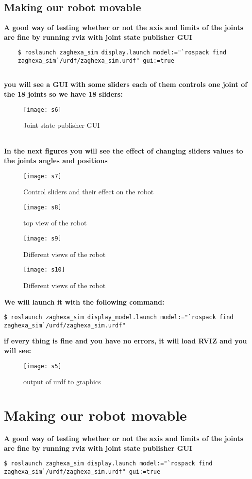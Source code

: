 	\subsection{Making our robot movable}
	\textbf{A good way of testing whether or not the axis and limits of the joints are fine by running rviz with joint state publisher GUI}
	\begin{lstlisting}
	$ roslaunch zaghexa_sim display.launch model:="`rospack find
	zaghexa_sim`/urdf/zaghexa_sim.urdf" gui:=true
	
	\end{lstlisting}
	\textbf{you will see a GUI with some sliders each of them controls one joint of the 18 joints so we have 18 sliders:}
	\begin{figure}[h]
		\centering
		\texttt{[image: s6]}
		\caption{Joint state publisher GUI}
		\label{fig:s6}
	\end{figure}
	\\\textbf{In the next figures you will see the effect of changing sliders values to the joints angles and positions}
	\begin{figure}[H]
		\centering
		\texttt{[image: s7]}
		\caption{Control sliders and their effect on the robot }
		\label{fig:s7}
	\end{figure}
	\begin{figure}[htb]
		\centering
		\texttt{[image: s8]}
		\caption{top view of the robot}
		\label{fig:s8}
		\texttt{[image: s9]}
		\caption{Different views of the robot}
		\label{fig:s9}
		\texttt{[image: s10]}
		\caption{Different views of the robot}
		\label{fig:s10}
	\end{figure}
\clearpage
\vspace{10cm}
\textbf{We will launch it with the following command:}
\begin{lstlisting}[language=terCmd]
$ roslaunch zaghexa_sim display_model.launch model:="`rospack find zaghexa_sim`/urdf/zaghexa_sim.urdf"
\end{lstlisting}

\textbf{if every thing is fine and you have no errors, it will load RVIZ and you will see:}
\begin{figure}[H]
	\centering
	\texttt{[image: s5]}
	\caption{output of urdf to graphics}
	\label{figure :s5}
\end{figure}

\section{Making our robot movable}
\textbf{A good way of testing whether or not the axis and limits of the joints are fine by running rviz with joint state publisher GUI}
\begin{lstlisting}[language=terCmd]
$ roslaunch zaghexa_sim display.launch model:="`rospack find zaghexa_sim`/urdf/zaghexa_sim.urdf" gui:=true
\end{lstlisting}


